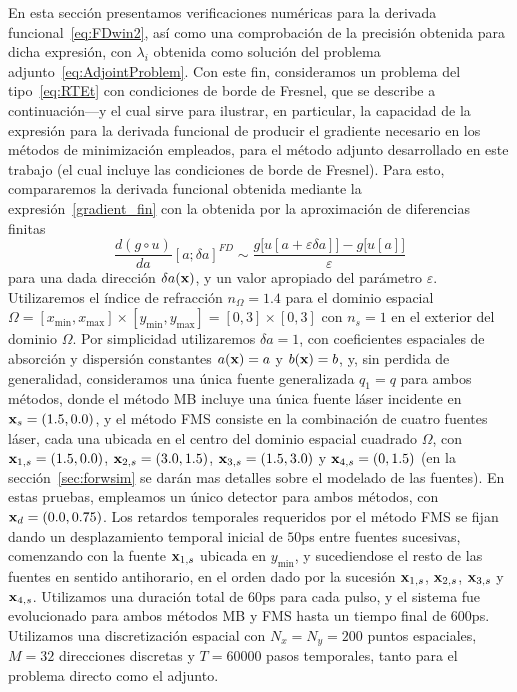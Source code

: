  En esta sección presentamos verificaciones numéricas para la derivada 
 funcional~\eqref{eq:FDwin2}, así como una comprobación de la precisión 
 obtenida para dicha expresión, con $\lambda_i$ obtenida como solución del 
 problema adjunto~\eqref{eq:AdjointProblem}. Con este fin, 
 consideramos un problema del tipo~\eqref{eq:RTEt} con condiciones 
 de borde de Fresnel, que se describe a continuación---y el cual 
 sirve para ilustrar, en particular, la capacidad de la expresión 
 para la derivada funcional de producir el gradiente necesario 
 en los métodos de minimización empleados, para el método adjunto desarrollado en este trabajo (el cual incluye las condiciones de borde de Fresnel). 
 Para esto, compararemos la derivada funcional obtenida mediante la expresión~\eqref{gradient_fin} con la obtenida por la aproximación 
 de diferencias finitas
 \begin{equation}
  \frac{d (g \circ u)}{da}[a;\delta a]^{FD} \sim
  \frac{g\big[u[a+\varepsilon \delta a]\big]
    -g\big[u[a]\big]}{\varepsilon}
\label{eq:ObjFD}
\end{equation}
para una dada dirección $\delta a(\mathbf{x})$, y un valor apropiado del parámetro $\varepsilon$. 
Utilizaremos el índice de refracción $n_{\Omega}=1.4$ para el dominio espacial $\Omega=[x_{\text{min}},x_{\text{max}}]\times[y_{\text{min}},y_{\text{max}}]=[0,3]\times[0,3]$ 
con $n_s=1$ en el exterior del dominio $\Omega$.  Por simplicidad utilizaremos $\delta a=1$, 
con coeficientes espaciales de absorción y dispersión constantes $a(\mathbf{x})=a$ y $b(\mathbf{x})=b$, 
y, sin perdida de generalidad, consideramos una única fuente generalizada $q_1 = q$ 
para ambos métodos, donde el método MB incluye una única fuente láser 
incidente en $\mathbf{x}_s=(1.5,0.0)$, y el método FMS consiste en la combinación 
de cuatro fuentes láser, cada una ubicada en el centro del dominio espacial cuadrado 
$\Omega$, con $\mathbf{x}_{1,s}=(1.5,0.0)$, $\mathbf{x}_{2,s}=(3.0,1.5)$, $\mathbf{x}_{3,s}=(1.5,3.0)$ 
y  $\mathbf{x}_{4,s}=(0,1.5)$ (en la sección~\ref{sec:forwsim} se darán mas detalles 
sobre el modelado de las fuentes). En estas pruebas, empleamos un único 
detector para ambos métodos, con $\mathbf{x}_d=(0.0,0.75)$. Los retardos 
temporales requeridos por el método FMS se fijan dando un desplazamiento 
temporal inicial de $50$ps entre fuentes sucesivas, comenzando con la fuente 
 $\mathbf{x}_{1,s}$ ubicada en $y_{\text{min}}$, y sucediendose el resto de las fuentes 
 en sentido antihorario, en el orden dado por la sucesión $\mathbf{x}_{1,s}$, $\mathbf{x}_{2,s}$, $\mathbf{x}_{3,s}$ y $\mathbf{x}_{4,s}$. Utilizamos una duración total de $60$ps para cada pulso, y el sistema 
 fue evolucionado para ambos métodos MB y FMS hasta un tiempo final de $600$ps. 
 Utilizamos una discretización espacial con $N_x=N_y=200$ puntos espaciales, 
 $M=32$ direcciones discretas y $T=60000$ pasos temporales, tanto para el 
 problema directo como el adjunto. 
 
